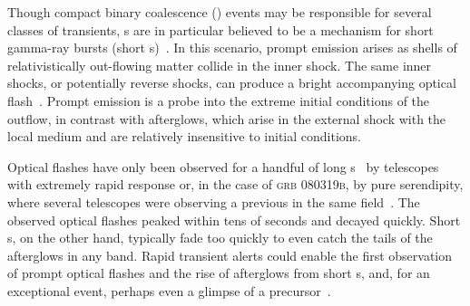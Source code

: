 Though compact binary coalescence (\CBC{}) events may be responsible for several
classes of \EM{} transients, \CBC{}s are in particular believed to be a
mechanism for short gamma-ray bursts (short \GRB{}s)~\cite{Lee:2005, nakar07}.
In this scenario, prompt \EM{} emission arises as shells of
relativistically out-flowing matter collide in the inner shock.
The same inner shocks, or potentially reverse shocks, can produce a bright
accompanying optical flash~\cite{Sari99}. Prompt emission is a probe into
the extreme initial conditions of the outflow, in contrast with afterglows,
which arise in the external shock with the local medium and are relatively
insensitive to initial conditions.

Optical flashes have only been observed for a handful of long
\GRB{}s~\cite{2011CRPhy..12..255A} by telescopes with extremely rapid response
or, in the case of \textsc{grb 080319b}, by pure serendipity, where several
telescopes were observing a previous \GRB{} in the same
field~\cite{2008Natur.455..183R}. The observed optical flashes peaked
within tens of seconds and decayed quickly.
Short \GRB{}s, on the other hand, typically
fade too quickly to even catch the tails of the afterglows in any band. Rapid
\GW{} transient alerts could enable the first observation of
prompt optical flashes and the rise of afterglows from short \GRB{}s, and, for
an exceptional event, perhaps even a glimpse of a
precursor~\cite{0004-637X-723-2-1711}.

